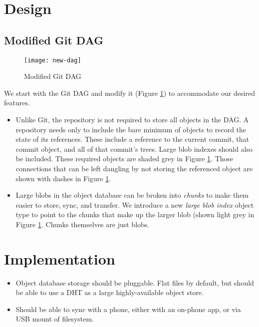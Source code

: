 \documentclass[a4paper]{article}
\newcommand{\newterm}{\textit}
\begin{document}
\section{Design}\label{design}

\subsection{Modified Git DAG}

\begin{figure}[h!]
    \caption{Modified Git DAG}
    \label{fig:new-dag}
    \centering
        \texttt{[image: new-dag]}
\end{figure}

We start with the Git DAG and modify it (Figure \ref{fig:new-dag}) to
accommodate our desired features.

\begin{itemize}
    \item
        Unlike Git, the repository is not required to store all objects in the
        DAG. A repository needs only to include the bare minimum of objects to
        record the state of its references. These include a reference to the
        current commit, that commit object, and all of that commit's trees.
        Large blob indexes should also be included. These required objects are
        shaded grey in Figure \ref{fig:new-dag}. Those connections that can be
        left dangling by not storing the referenced object are shown with dashes
        in Figure \ref{fig:new-dag}.
    \item
        Large blobs in the object database can be broken into \newterm{chunks}
        to make them easier to store, sync, and transfer. We introduce a new
        \newterm{large blob index} object type to point to the chunks that make
        up the larger blob (shown light grey in Figure \ref{fig:new-dag}.
        Chunks themselves are just blobs.
\end{itemize}


\section{Implementation}\label{implementation}

\begin{itemize}
  \item
    Object database storage should be pluggable. Flat files by default, but
    should be able to use a DHT as a large highly-available object store.
  \item
    Should be able to sync with a phone, either with an on-phone app, or via USB
    mount of filesystem.
\end{itemize}

\nocite{*}  %


\end{document}
